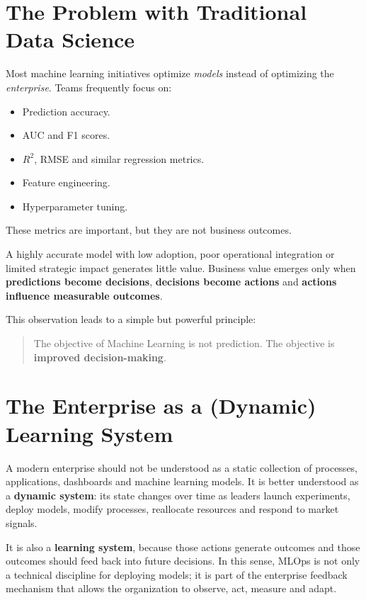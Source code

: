 \documentclass[
  a4paper,
  DIV=11,
  numbers=noendperiod]{scrartcl}
\providecommand{\tightlist}{%
  \setlength{\itemsep}{0pt}\setlength{\parskip}{0pt}}
\begin{document}
\section{The Problem with Traditional Data
Science}\label{the-problem-with-traditional-data-science}

Most machine learning initiatives optimize \emph{models} instead of
optimizing the \emph{enterprise}. Teams frequently focus on:

\begin{itemize}
\tightlist
\item
  Prediction accuracy.
\item
  AUC and F1 scores.
\item
  \(R^2\), RMSE and similar regression metrics.
\item
  Feature engineering.
\item
  Hyperparameter tuning.
\end{itemize}

These metrics are important, but they are not business outcomes.

A highly accurate model with low adoption, poor operational integration
or limited strategic impact generates little value. Business value
emerges only when \textbf{predictions become decisions},
\textbf{decisions become actions} and \textbf{actions influence
measurable outcomes}.

This observation leads to a simple but powerful principle:

\begin{quote}
The objective of Machine Learning is not prediction. The objective is
\textbf{improved decision-making}.
\end{quote}

\section{The Enterprise as a (Dynamic) Learning
System}\label{the-enterprise-as-a-dynamic-learning-system}

A modern enterprise should not be understood as a static collection of
processes, applications, dashboards and machine learning models. It is
better understood as a \textbf{dynamic system}: its state changes over
time as leaders launch experiments, deploy models, modify processes,
reallocate resources and respond to market signals.

It is also a \textbf{learning system}, because those actions generate
outcomes and those outcomes should feed back into future decisions. In
this sense, MLOps is not only a technical discipline for deploying
models; it is part of the enterprise feedback mechanism that allows the
organization to observe, act, measure and adapt.
\end{document}
